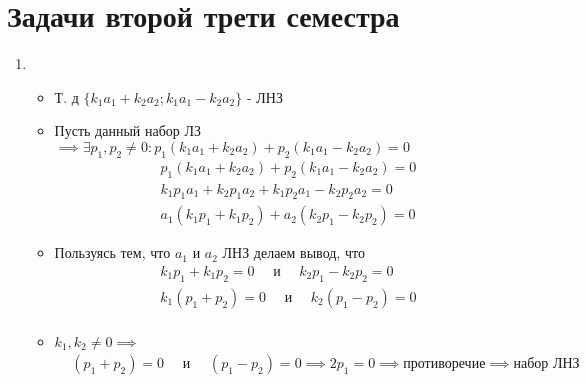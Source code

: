 \documentclass{article}
\begin{document}
\section*{Задачи второй трети семестра}
\begin{enumerate}
    \item 
    \begin{itemize}
        \item Т. д $\{k_1 a_1 + k_2 a_2; k_1 a_1 - k_2 a_2\}$ - ЛНЗ
        \item Пусть данный набор ЛЗ $\implies \exists p_1, p_2 \neq 0: p_1 (k_1 a_1 + k_2 a_2) + p_2 (k_1 a_1 - k_2 a_2) = 0$ 
        \begin{align*}
            &p_1 (k_1 a_1 + k_2 a_2) + p_2 (k_1 a_1 - k_2 a_2) = 0 \\
            &k_1p_1a_1 + k_2p_1a_2 + k_1p_2a_1 - k_2p_2a_2 = 0 \\
            &a_1(k_1p_1 + k_1p_2) + a_2(k_2p_1 - k_2p_2) = 0
        \end{align*}
        \item Пользуясь тем, что $a_1$ и $a_2$ ЛНЗ делаем вывод, что 
        \begin{align*}
            &k_1 p_1 + k_1 p_2 =0\quad \text{ и } \quad k_2 p_1 - k_2 p_2 = 0 \\
            &k_1 (p_1 + p_2) =0\quad \text{ и } \quad k_2 (p_1 - p_2) = 0 \\
        \end{align*}
        \item $k_1, k_2 \neq 0 \implies $
        \begin{align*}
            &(p_1 + p_2) =0\quad \text{ и } \quad (p_1 - p_2) = 0 \implies 2p_1 = 0 \implies \text{противоречие} \implies \text{набор ЛНЗ}\\
        \end{align*}
        

\end{itemize}
\end{enumerate}
\end{document}
